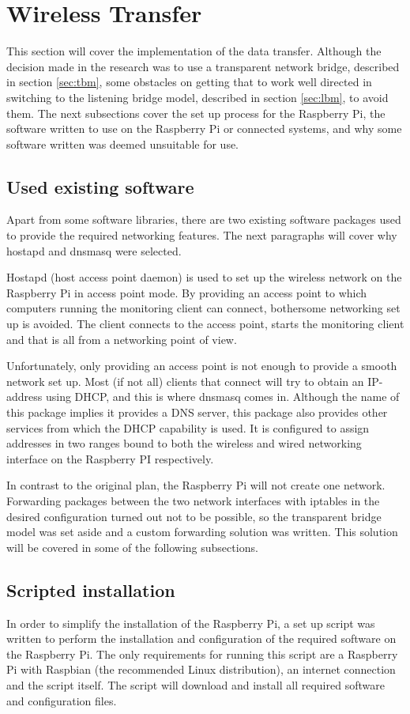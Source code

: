 \section{Wireless Transfer}
\label{sec:wireless}
This section will cover the implementation of the data transfer. Although the decision made in the research was to use a transparent network bridge, described in section \ref{sec:tbm}, some obstacles on getting that to work well directed in switching to the listening bridge model, described in section \ref{sec:lbm}, to avoid them. The next subsections cover the set up process for the Raspberry Pi, the software written to use on the Raspberry Pi or connected systems, and why some software written was deemed unsuitable for use.
\subsection{Used existing software}
Apart from some software libraries, there are two existing software packages used to provide the required networking features. The next paragraphs will cover why hostapd and dnsmasq were selected.

Hostapd (host access point daemon) is used to set up the wireless network on the Raspberry Pi in access point mode. By providing an access point to which computers running the monitoring client can connect, bothersome networking set up is avoided. The client connects to the access point, starts the monitoring client and that is all from a networking point of view.

Unfortunately, only providing an access point is not enough to provide a smooth network set up. Most (if not all) clients that connect will try to obtain an IP-address using DHCP, and this is where dnsmasq comes in. Although the name of this package implies it provides a DNS server, this package also provides other services from which the DHCP capability is used. It is configured to assign addresses in two ranges bound to both the wireless and wired networking interface on the Raspberry PI respectively.

In contrast to the original plan, the Raspberry Pi will not create one network. Forwarding packages between the two network interfaces with iptables in the desired configuration turned out not to be possible, so the transparent bridge model was set aside and a custom forwarding solution was written. This solution will be covered in some of the following subsections.

\subsection{Scripted installation}
In order to simplify the installation of the Raspberry Pi, a set up script was written to perform the installation and configuration of the required software on the Raspberry Pi. The only requirements for running this script are a Raspberry Pi with Raspbian (the recommended Linux distribution), an internet connection and the script itself. The script will download and install all required software and configuration files.

